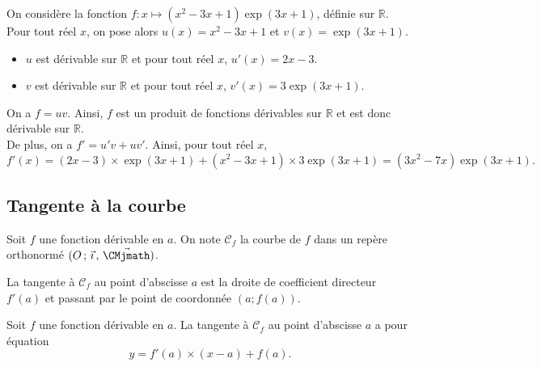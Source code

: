 \documentclass[11pt,fleqn, openany]{book} %
\begin{document}
\begin{example}On considère la fonction $f:x\mapsto (x^2-3x+1)\exp(3x+1)$, définie sur $\mathbb{R}$. \\ Pour tout réel $x$, on pose alors $u(x)=x^2-3x+1$ et $v(x)=\exp(3x+1)$. 

\begin{itemize}
\item $u$ est dérivable sur $\mathbb{R}$ et pour tout réel $x$, $u'(x)=2x-3$.
\item $v$ est dérivable sur $\mathbb{R}$ et pour tout réel $x$, $v'(x)=3\exp (3x+1)$.
\end{itemize}

On a $f=uv$. Ainsi, $f$ est un produit de fonctions dérivables sur $\mathbb{R}$ et est donc dérivable sur $\mathbb{R}$. \\ De plus, on a $f'=u'v+uv'$. Ainsi, pour tout réel $x$, 
\[ f'(x)=(2x-3) \times  \exp(3x+1) + (x^2-3x+1) \times 3\exp (3x+1) = (3x^2-7x)\exp(3x+1).\]
\vspace{-0.5cm}\end{example}

\subsection{Tangente à la courbe}

\begin{definition} Soit $f$ une fonction dérivable en $a$. On note $\mathcal{C}_f$ la courbe de $f$ dans un repère orthonormé $\Oij$. 

La tangente à $\mathcal{C}_f$ au point d'abscisse $a$ est la droite de coefficient directeur $f'(a)$ et passant par le point de coordonnée $(a;f(a))$.\end{definition} 

\begin{proposition}Soit $f$ une fonction dérivable en $a$. La tangente à $\mathcal{C}_f$ au point d'abscisse $a$ a pour équation 
\[ y =f'(a)\times (x-a)+f(a).\]\end{proposition}
\end{document}
